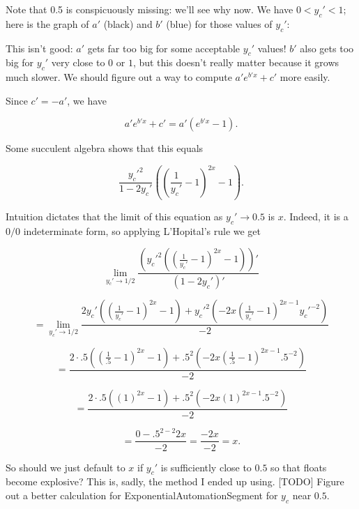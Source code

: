 \documentclass{article}
\begin{document}
Note that 0.5 is conspicuously missing: we'll see why now. We have $0<y_c'<1$; here is the graph of $a'$ (black) and $b'$ (blue) for those values of $y_c'$:


This isn't good: $a'$ gets far too big for some acceptable $y_c'$ values! $b'$ also gets too big for $y_c'$ very close to $0$ or $1$, but this doesn't really matter because it grows much slower. We should figure out a way to compute $a'e^{b'x}+c'$ more easily.

Since $c' = -a'$, we have

$$a'e^{b'x}+c'=a'(e^{b'x}-1).$$

Some succulent algebra shows that this equals

$$\frac{y_c'^2}{1-2y_c'}\left(\left(\frac{1}{y_c'}-1\right)^{2x}-1\right).$$

Intuition dictates that the limit of this equation as $y_c'\to 0.5$ is $x$. Indeed, it is a $0/0$ indeterminate form, so applying L'Hopital's rule we get

$$\lim_{y_c'\to 1/2}\frac{\left(y_c'^2\left(\left(\frac{1}{y_c'}-1\right)^{2x}-1\right)\right)'}{\left(1-2y_c'\right)'}$$

$$=\lim_{y_c'\to 1/2}\frac{2y_c'\left(\left(\frac{1}{y_c'}-1\right)^{2x}-1\right)+y_c'^2\left(-2x\left(\frac{1}{y_c'}-1\right)^{2x-1}y_c'^{-2}\right)}{-2}$$

$$=\frac{2\cdot .5\left(\left(\frac{1}{.5}-1\right)^{2x}-1\right)+.5^2\left(-2x\left(\frac{1}{.5}-1\right)^{2x-1}.5^{-2}\right)}{-2}$$

$$=\frac{2\cdot .5\left(\left(1\right)^{2x}-1\right)+.5^2\left(-2x\left(1\right)^{2x-1}.5^{-2}\right)}{-2}$$

$$=\frac{0-.5^{2-2}2x}{-2}=\frac{-2x}{-2}=x.$$

So should we just default to $x$ if $y_c'$ is sufficiently close to $0.5$ so that floats become explosive? This is, sadly, the method I ended up using. [TODO] Figure out a better calculation for ExponentialAutomationSegment for $y_c$ near $0.5$.
\end{document}
